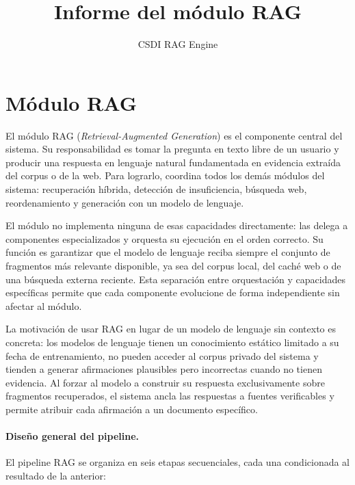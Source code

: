 \documentclass[11pt]{article}
\title{Informe del módulo RAG}
\author{CSDI RAG Engine}
\date{}
\begin{document}
\maketitle

\section{Módulo RAG}

El módulo RAG (\emph{Retrieval-Augmented Generation}) es el componente central del sistema. Su
responsabilidad es tomar la pregunta en texto libre de un usuario y producir una respuesta en
lenguaje natural fundamentada en evidencia extraída del corpus o de la web. Para lograrlo,
coordina todos los demás módulos del sistema: recuperación híbrida, detección de insuficiencia,
búsqueda web, reordenamiento y generación con un modelo de lenguaje.

El módulo no implementa ninguna de esas capacidades directamente: las delega a componentes
especializados y orquesta su ejecución en el orden correcto. Su función es garantizar que el
modelo de lenguaje reciba siempre el conjunto de fragmentos más relevante disponible, ya sea
del corpus local, del caché web o de una búsqueda externa reciente. Esta separación entre
orquestación y capacidades específicas permite que cada componente evolucione de forma
independiente sin afectar al módulo.

La motivación de usar RAG en lugar de un modelo de lenguaje sin contexto es concreta: los
modelos de lenguaje tienen un conocimiento estático limitado a su fecha de entrenamiento, no
pueden acceder al corpus privado del sistema y tienden a generar afirmaciones plausibles pero
incorrectas cuando no tienen evidencia. Al forzar al modelo a construir su respuesta
exclusivamente sobre fragmentos recuperados, el sistema ancla las respuestas a fuentes
verificables y permite atribuir cada afirmación a un documento específico.

\paragraph{Diseño general del pipeline.}
El pipeline RAG se organiza en seis etapas secuenciales, cada una condicionada al resultado de
la anterior:
\end{document}
